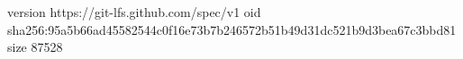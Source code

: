 version https://git-lfs.github.com/spec/v1
oid sha256:95a5b66ad45582544c0f16e73b7b246572b51b49d31dc521b9d3bea67c3bbd81
size 87528
